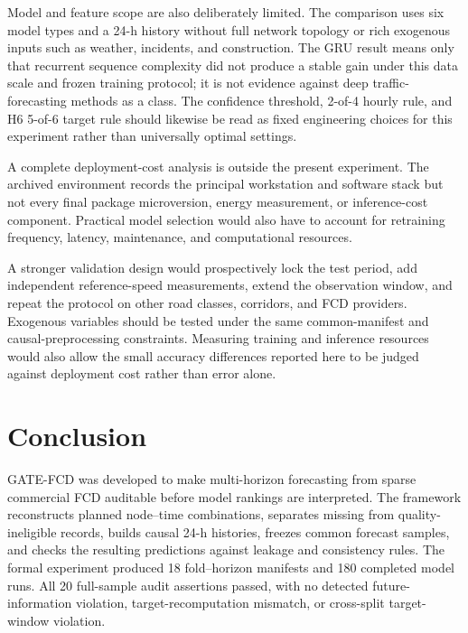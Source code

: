\documentclass[pdflatex,sn-basic,Numbered]{sn-jnl}
\begin{document}
Model and feature scope are also deliberately limited. The comparison uses six model types and a 24-h history without full network topology or rich exogenous inputs such as weather, incidents, and construction. The GRU result means only that recurrent sequence complexity did not produce a stable gain under this data scale and frozen training protocol; it is not evidence against deep traffic-forecasting methods as a class. The confidence threshold, 2-of-4 hourly rule, and H6 5-of-6 target rule should likewise be read as fixed engineering choices for this experiment rather than universally optimal settings.

A complete deployment-cost analysis is outside the present experiment. The archived environment records the principal workstation and software stack but not every final package microversion, energy measurement, or inference-cost component. Practical model selection would also have to account for retraining frequency, latency, maintenance, and computational resources.

A stronger validation design would prospectively lock the test period, add independent reference-speed measurements, extend the observation window, and repeat the protocol on other road classes, corridors, and FCD providers. Exogenous variables should be tested under the same common-manifest and causal-preprocessing constraints. Measuring training and inference resources would also allow the small accuracy differences reported here to be judged against deployment cost rather than error alone.

\section{Conclusion}
\label{sec:conclusion}

GATE-FCD was developed to make multi-horizon forecasting from sparse commercial FCD auditable before model rankings are interpreted. The framework reconstructs planned node--time combinations, separates missing from quality-ineligible records, builds causal 24-h histories, freezes common forecast samples, and checks the resulting predictions against leakage and consistency rules. The formal experiment produced 18 fold--horizon manifests and 180 completed model runs. All 20 full-sample audit assertions passed, with no detected future-information violation, target-recomputation mismatch, or cross-split target-window violation.
\end{document}
